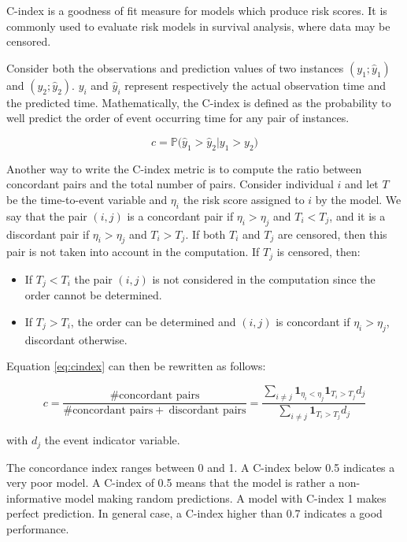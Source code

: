 \documentclass[
]{book}
\providecommand{\tightlist}{%
  \setlength{\itemsep}{0pt}\setlength{\parskip}{0pt}}
\begin{document}
C-index is a goodness of fit measure for models which produce risk scores. It is commonly used to evaluate risk models in survival analysis, where data may be censored.

Consider both the observations and prediction values of two instances \((y_1; \hat{y}_1)\) and \((y_2; \hat{y}_2)\). \(y_i\) and \(\hat{y}_i\) represent respectively the actual observation time and the predicted time. Mathematically, the C-index is defined as the probability to well predict the order of event occurring time for any pair of instances.

\begin{equation}
  c = \mathbb{P}\big(\hat{y}_1 > \hat{y}_2 | y_1 > y_2\big)
  \label{eq:cindex}
\end{equation}

Another way to write the C-index metric is to compute the ratio between concordant pairs and the total number of pairs. Consider individual \(i\) and let \(T\) be the time-to-event variable and \(\eta_i\) the risk score assigned to \(i\) by the model. We say that the pair \((i, j)\) is a concordant pair if \(\eta_i > \eta_j\) and \(T_i < T_j\), and it is a discordant pair if \(\eta_i > \eta_j\) and \(T_i > T_j\). If both \(T_i\) and \(T_j\) are censored, then this pair is not taken into account in the computation. If \(T_j\) is censored, then:

\begin{itemize}
\tightlist
\item
  If \(T_j < T_i\) the pair \((i, j)\) is not considered in the computation since the order cannot be determined.
\item
  If \(T_j > T_i\), the order can be determined and \((i, j)\) is concordant if \(\eta_i > \eta_j\), discordant otherwise.
\end{itemize}

Equation \eqref{eq:cindex} can then be rewritten as follows:

\begin{equation}
c = \frac{\# \text{concordant pairs}}{\# \text{concordant pairs} + \ \text{discordant pairs}} = \frac{\sum_{i \neq j} \pmb{1}_{\eta_i < \eta_j} \pmb{1}_{T_i > T_j}d_j}{\sum_{i \neq j} \pmb{1}_{T_i > T_j}d_j}
\label{eq:cindex2}
\end{equation}

with \(d_j\) the event indicator variable.

The concordance index ranges between 0 and 1. A C-index below 0.5 indicates a very poor model. A C-index of 0.5 means that the model is rather a non-informative model making random predictions. A model with C-index 1 makes perfect prediction. In general case, a C-index higher than 0.7 indicates a good performance.
\end{document}
